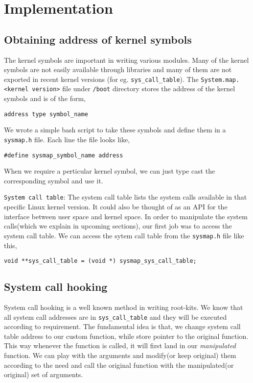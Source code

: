 \documentclass[10pt, letterpaper]{scrartcl}
\begin{document}
\section{Implementation}

\subsection{Obtaining address of kernel symbols}
The kernel symbols are important in writing various modules. Many of the kernel symbols are not easily available through libraries 
and many of them are not exported in recent kernel versions (for eg. \texttt{sys\_call\_table}).
The \texttt{System.map.<kernel version>} file under \texttt{/boot} directory stores the address of the kernel symbols and is of the form, 
\begin{verbatim}
address type symbol_name
\end{verbatim}

We wrote a simple bash script to take these symbols and define them in a \texttt{sysmap.h} file. 
Each line the file looks like, 

\begin{verbatim}
#define sysmap_symbol_name address
\end{verbatim}

When we require a perticular kernel symbol, we can just type cast the corresponding symbol and use it. 

\texttt{System call table}: The system call table lists the system calls available in that specific Linux kernel version. 
It could also be thought of as an API for the interface between user space and kernel space. 
In order to manipulate the system calls(which we explain in upcoming sections), our first job was to access the system call table.
We can access the sytem call table from the \texttt{sysmap.h} file like this,

\begin{verbatim}
void **sys_call_table = (void *) sysmap_sys_call_table;
\end{verbatim}

\subsection{System call hooking}
System call hooking is a well known method in writing root-kits. 
We know that all system call addresses are in \texttt{sys\_call\_table} and they will be executed according to requirement.
The fundamental idea is that, we change system call table address to our custom function, 
while store pointer to the original function. This way whenever the function is called, 
it will first land in our {\em manipulated} function. 
We can play with the arguments and modify(or keep original) them according to the need and call the original function with the manipulated(or original) set of arguments. 
\end{document}
